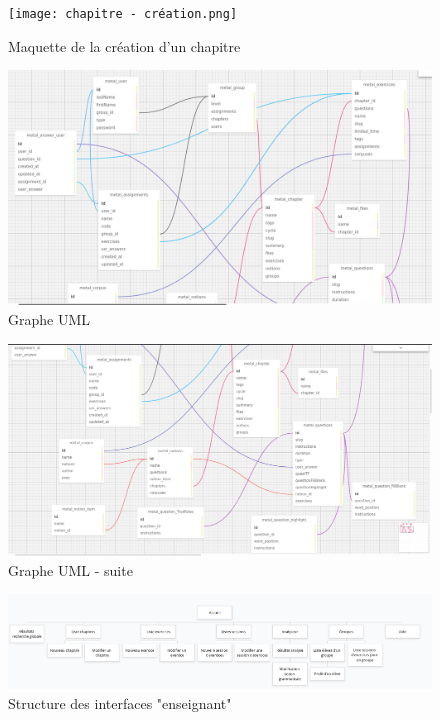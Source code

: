 \documentclass[12pt]{article}
\begin{document}
\begin{figure}
    \centering
    \texttt{[image: chapitre - création.png]}
    \caption{Maquette de la création d'un chapitre}
    \label{fig:mquette2}
\end{figure}


\begin{figure}
    \centering
    \includegraphics[scale=0.3]{uml1.png}
    \caption{Graphe UML}
    \label{fig:UML1}
\end{figure}

\begin{figure}
    \centering
    \includegraphics[scale=0.27]{uml2.png}
    \caption{Graphe UML - suite}
    \label{fig:UML2}
\end{figure}


\begin{figure}
    \centering
    \includegraphics[scale=0.33]{arbre_pages_web.png}
    \caption{Structure des interfaces "enseignant"}
    \label{fig:arbre_pages}
\end{figure}
\end{document}

